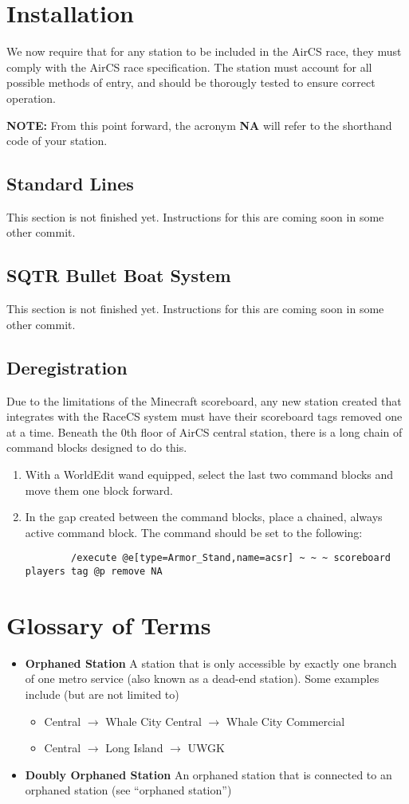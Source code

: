 \documentclass{article}
\newcommand{\defterm}[2]{\textbf{#1} #2}
\begin{document}
\section{Installation}
We now require that for any station to be included in the AirCS race, they must comply with the AirCS race specification. The station must account for all possible methods of entry, and should be thorougly tested to ensure correct operation.

\textbf{NOTE: } From this point forward, the acronym \textbf{NA} will refer to the shorthand code of your station.
\subsection{Standard Lines}
This section is not finished yet. Instructions for this are coming soon in some other commit.
\subsection{SQTR Bullet Boat System}
This section is not finished yet. Instructions for this are coming soon in some other commit.
\subsection{Deregistration}
Due to the limitations of the Minecraft scoreboard, any new station created that integrates with the RaceCS system must have their scoreboard tags removed one at a time. Beneath the 0th floor of AirCS central station, there is a long chain of command blocks designed to do this. 
\begin{enumerate}
    \item With a WorldEdit wand equipped, select the last two command blocks and move them one block forward.
    \item In the gap created between the command blocks, place a chained, always active command block. The command should be set to the following:
    \begin{lstlisting}
        /execute @e[type=Armor_Stand,name=acsr] ~ ~ ~ scoreboard players tag @p remove NA
    \end{lstlisting}
\end{enumerate}

\section{Glossary of Terms}
\begin{itemize}
    \item \defterm{Orphaned Station}{A station that is only accessible by exactly one branch of one metro service (also known as a dead-end station). Some examples include (but are not limited to)}
    \begin{itemize}
        \item Central $\rightarrow$ Whale City Central $\rightarrow$ Whale City Commercial
        \item Central $\rightarrow$ Long Island $\rightarrow$ UWGK
    \end{itemize}
    \item \defterm{Doubly Orphaned Station}{An orphaned station that is connected to an orphaned station (see ``orphaned station'')}
\end{itemize}
\end{document}
